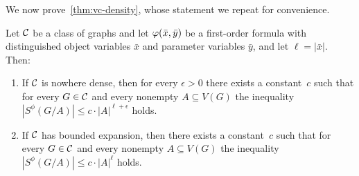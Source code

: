 \medskip
We  now prove~\cref{thm:vc-density}, whose statement we repeat for convenience. 
\setcounter{theorem}{2}
\begin{theorem}
Let $\mathcal{C}$ be a class of graphs and let $\varphi(\bar{x},\bar{y})$ be a first-order formula with distinguished object variables $\bar x$ and parameter variables $\bar y$, and let $\ell=|\bar x|$. Then:
\begin{enumerate}[(1)]
\item If $\mathcal{C}$ is nowhere dense, then for every $\epsilon>0$ 
there exists a constant~$c$ such that for every $G\in \mathcal{C}$ and every nonempty
$A\subseteq V(G)$ the inequality $|S^\phi(G/A)|\leq c\cdot |A|^{\ell+\epsilon}$ holds.

\item If $\mathcal{C}$ has bounded expansion, then there exists a constant~$c$ such that for every $G\in \mathcal{C}$ and every nonempty $A\subseteq V(G)$ the inequality $|S^\phi(G/A)|\leq c\cdot |A|^\ell$ holds.
\end{enumerate}
\end{theorem}


